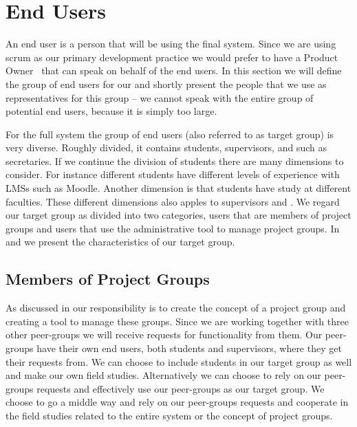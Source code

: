 \section{End Users}
\label{sec:enduser}
An end user is a person that will be using the final system.
Since we are using scrum as our primary development practice we would prefer to have a Product Owner~\cite[p.~115]{Larman04} that can speak on behalf of the end users.
In this section we will define the group of end users for our \subsystem{} and shortly present the people that we use as representatives for this group -- we cannot speak with the entire group of potential end users, because it is simply too large.

For the full system the group of end users (also referred to as target group) is very diverse.
Roughly divided, it contains students, supervisors, and \admpers{} such as secretaries.
If we continue the division of students there are many dimensions to consider. 
For instance different students have different levels of experience with LMSs such as Moodle. Another dimension is that students have study at different faculties.
These different dimensions also apples to supervisors and \admpers{}.
We regard our target group as divided into two categories, users that are members of project groups and users that use the administrative tool to manage project groups.
In  and  we present the characteristics of our target group.

\subsection{Members of Project Groups}
\label{sub:endusersmembers}
As discussed in  our responsibility is to create the concept of a project group and creating a tool to manage these groups.
Since we are working together with three other peer-groups we will receive requests for functionality from them.
Our peer-groups have their own end users, both students and supervisors, where they get their requests from.
We can choose to include students in our target group as well and make our own field studies.
Alternatively we can choose to rely on our peer-groups requests and effectively use our peer-groups as our target group.
We choose to go a middle way and rely on our peer-groups requests and cooperate in the field studies related to the entire system or the concept of project groups.

